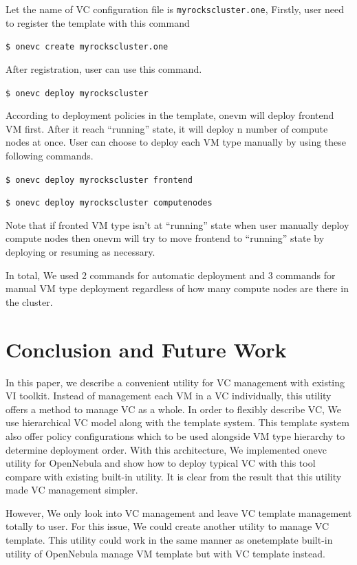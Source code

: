 \documentclass[conference]{IEEEtran}
\begin{document}
Let the name of VC configuration file is \texttt{myrockscluster.one}, Firstly, user need to register the template with this command

\texttt{\$ onevc create myrockscluster.one}

After registration, user can use this command.

\texttt{\$ onevc deploy myrockscluster}

According to deployment policies in the template, onevm will deploy frontend VM first.
After it reach ``running'' state, it will deploy n number of compute nodes at once.
User can choose to deploy each VM type manually by using these following commands. 

\texttt{\$ onevc deploy myrockscluster frontend}

\texttt{\$ onevc deploy myrockscluster computenodes}

Note that if fronted VM type isn't at ``running'' state when user manually deploy compute nodes then onevm will try to move frontend to ``running'' state by deploying or resuming as necessary.

In total, We used 2 commands for automatic deployment and 3 commands for manual VM type deployment regardless of how many compute nodes are there in the cluster.

\section{Conclusion and Future Work}
In this paper, we describe a convenient utility for VC management with existing VI toolkit.
Instead of management each VM in a VC individually, this utility offers a method to manage VC as a whole.
In order to flexibly describe VC, We use hierarchical VC model along with the template system.
This template system also offer policy configurations which to be used alongside VM type hierarchy to determine deployment order.
With this architecture, We implemented onevc utility for OpenNebula and show how to deploy typical VC with this tool compare with existing built-in utility.
It is clear from the result that this utility made VC management simpler.

However, We only look into VC management and leave VC template management totally to user.
For this issue, We could create another utility to manage VC template.
This utility could work in the same manner as onetemplate built-in utility of OpenNebula manage VM template but with VC template instead.

\end{document}
